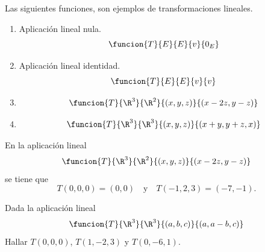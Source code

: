 \documentclass[compacto,10pt]{pubciencias-notas}
\begin{document}
\begin{ejem}\hspace{0pt} \label{ejem1}
Las siguientes funciones, son ejemplos de transformaciones lineales.
\begin{enumerate}
\item
    Aplicación lineal nula.
    \[
        \funcion{T}{E}{E}{v}{0_{E}}
    \]
\item
    Aplicación lineal identidad.
    \[
        \funcion{T}{E}{E}{v}{v}
    \]
    \item
    \[
        \funcion{T}{\R^3}{\R^2}{(x,y,z)}{(x-2z,y-z)}
    \]
    \item
    \[
        \funcion{T}{\R^3}{\R^3}{(x,y,z)}{(x + y,y + z,x)}
    \]
\end{enumerate}
\end{ejem}

\begin{ejem}
En la aplicación lineal
\[
        \funcion{T}{\R^3}{\R^2}{(x,y,z)}{(x-2z,y-z)}
\]
se tiene que
\[
    T(0,0,0)=(0,0) \quad \text{y} \quad T(-1,2,3)=(-7,-1).
\]
\end{ejem}

\begin{ejer}\label{Ejercicio1}
Dada la aplicación lineal 
    \[
        \funcion{T}{\R^3}{\R^3}{(a,b,c)}{(a,a-b,c)}
    \]
Hallar $T(0,0,0)$, $T(1,-2,3)$ y $T(0,-6,1)$.
\end{ejer}
\end{document}
